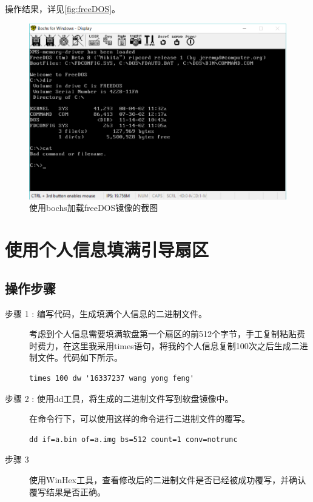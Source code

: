 \documentclass[forprint]{WHUBachelor}
\begin{document}
操作结果，详见\autoref{fig:freeDOS}。
\begin{figure}[htp]
  \centering
  \includegraphics[width=13cm]{"./figure/use_freeDOS.png"}
  \caption{使用bochs加载freeDOS镜像的截图}
  \label{fig:freeDOS}
\end{figure}

\section{使用个人信息填满引导扇区}

\subsection{操作步骤}

\begin{description}
  \item [步骤 1 : 编写代码，生成填满个人信息的二进制文件。] 

  考虑到个人信息需要填满软盘第一个扇区的前512个字节，手工复制粘贴费时费力，在这里我采用times语句，将我的个人信息复制100次之后生成二进制文件。代码如下所示。
  \label{code:generate_infomation}
  \begin{lstlisting}
times 100 dw '16337237 wang yong feng'
  \end{lstlisting}

  \item [步骤 2 : 使用dd工具，将生成的二进制文件写到软盘镜像中。] 
  
  在命令行下，可以使用这样的命令进行二进制文件的覆写。

  \begin{lstlisting}
dd if=a.bin of=a.img bs=512 count=1 conv=notrunc
  \end{lstlisting}

  \item [步骤 3] 使用WinHex工具，查看修改后的二进制文件是否已经被成功覆写，并确认覆写结果是否正确。
\end{description}
\end{document}
